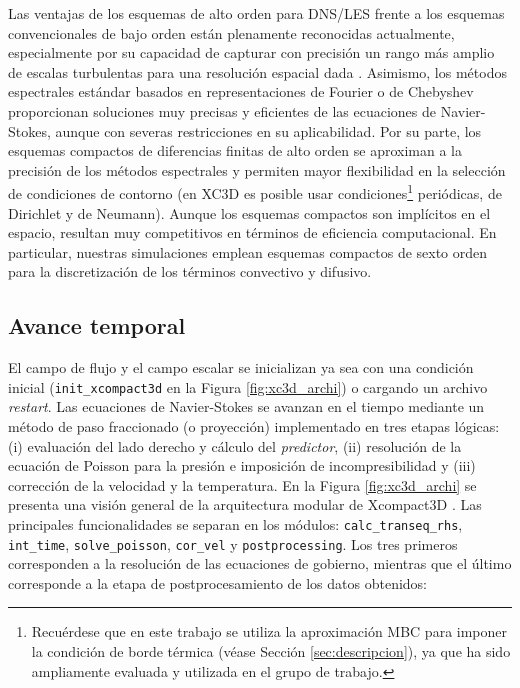 Las ventajas de los esquemas de alto orden para DNS/LES frente a los esquemas  convencionales de bajo orden están plenamente reconocidas actualmente, especialmente por su capacidad de capturar con precisión un rango más amplio de escalas turbulentas para una resolución espacial dada \cite{laizet2009high}. Asimismo, los métodos espectrales \linebreak estándar basados en representaciones de Fourier o de Chebyshev proporcionan soluciones muy precisas y eficientes de las ecuaciones de Navier-Stokes, aunque con severas restricciones en su aplicabilidad. Por su parte, los esquemas compactos de diferencias finitas de alto orden \cite{laizet2009high} se aproximan a la precisión de los métodos espectrales y permiten mayor flexibilidad en la selección de condiciones de contorno (en XC3D es posible usar condiciones\footnote{Recuérdese que en este trabajo se utiliza la aproximación MBC para imponer la condición de borde térmica (véase Sección \ref{sec:descripcion}), ya que ha sido ampliamente evaluada y utilizada en el grupo de trabajo.} periódicas, de Dirichlet y de Neumann). Aunque los esquemas compactos son implícitos en el espacio, resultan muy competitivos en términos de eficiencia computacional. En particular, nuestras simulaciones emplean esquemas compactos de sexto orden para la discretización de los términos convectivo y difusivo.

\subsection{Avance temporal} \label{sec:time-ava}

El campo de flujo y el campo escalar se inicializan ya sea con una condición inicial (\texttt{init\_xcompact3d} en la Figura \ref{fig:xc3d_archi}) o cargando un archivo \textit{restart}. Las ecuaciones de Navier-Stokes se avanzan en el tiempo mediante un método de paso fraccionado (o proyección) \textcolor{black}{\cite{chorin1968numerical}} implementado en tres etapas lógicas: (i) evaluación del lado derecho y cálculo del \textit{predictor}, \linebreak (ii) resolución de la ecuación de Poisson para la presión  e imposición de incompresibilidad y \linebreak (iii) corrección de la velocidad y la temperatura.  En la Figura \ref{fig:xc3d_archi} se presenta una visión \linebreak general de la arquitectura modular de Xcompact3D \cite{bartholomew2020xcompact3d}. Las principales funcionalidades se separan en los módulos: \texttt{calc\_transeq\_rhs}, \texttt{int\_time}, \texttt{solve\_poisson}, \texttt{cor\_vel} y \texttt{postprocessing}. Los tres primeros corresponden a la resolución de las ecuaciones de gobierno, mientras que el último corresponde a la etapa de postprocesamiento de los datos obtenidos:



